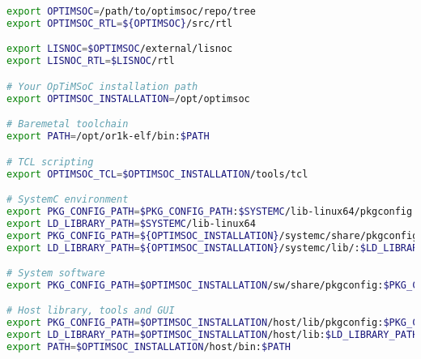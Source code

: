\begin{lstlisting}[language=bash]
export OPTIMSOC=/path/to/optimsoc/repo/tree
export OPTIMSOC_RTL=${OPTIMSOC}/src/rtl

export LISNOC=$OPTIMSOC/external/lisnoc
export LISNOC_RTL=$LISNOC/rtl

# Your OpTiMSoC installation path
export OPTIMSOC_INSTALLATION=/opt/optimsoc

# Baremetal toolchain
export PATH=/opt/or1k-elf/bin:$PATH

# TCL scripting
export OPTIMSOC_TCL=$OPTIMSOC_INSTALLATION/tools/tcl

# SystemC environment
export PKG_CONFIG_PATH=$PKG_CONFIG_PATH:$SYSTEMC/lib-linux64/pkgconfig
export LD_LIBRARY_PATH=$SYSTEMC/lib-linux64
export PKG_CONFIG_PATH=${OPTIMSOC_INSTALLATION}/systemc/share/pkgconfig:$PKG_CONFIG_PATH
export LD_LIBRARY_PATH=${OPTIMSOC_INSTALLATION}/systemc/lib/:$LD_LIBRARY_PATH

# System software
export PKG_CONFIG_PATH=$OPTIMSOC_INSTALLATION/sw/share/pkgconfig:$PKG_CONFIG_PATH

# Host library, tools and GUI
export PKG_CONFIG_PATH=$OPTIMSOC_INSTALLATION/host/lib/pkgconfig:$PKG_CONFIG_PATH
export LD_LIBRARY_PATH=$OPTIMSOC_INSTALLATION/host/lib:$LD_LIBRARY_PATH
export PATH=$OPTIMSOC_INSTALLATION/host/bin:$PATH
\end{lstlisting}

